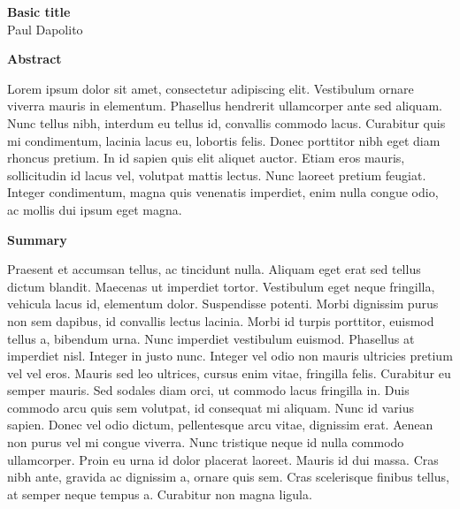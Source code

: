 \documentclass[letterpaper, boxed]{hmcpset}
\begin{document}
    \begin{center}
        \Large{\textbf{Basic title}} \\ 
        \large{Paul Dapolito} \\
    \end{center}

    \large \begin{flushleft}
    \textbf{Abstract}
    \end{flushleft}
    \normalsize
        Lorem ipsum dolor sit amet, consectetur adipiscing elit. Vestibulum ornare viverra mauris in elementum. Phasellus hendrerit ullamcorper ante sed aliquam. Nunc tellus nibh, interdum eu tellus id, convallis commodo lacus. Curabitur quis mi condimentum, lacinia lacus eu, lobortis felis. Donec porttitor nibh eget diam rhoncus pretium. In id sapien quis elit aliquet auctor. Etiam eros mauris, sollicitudin id lacus vel, volutpat mattis lectus. Nunc laoreet pretium feugiat. Integer condimentum, magna quis venenatis imperdiet, enim nulla congue odio, ac mollis dui ipsum eget magna.

    \large \begin{flushleft}
    \textbf{Summary}
    \end{flushleft}
    \normalsize
        Praesent et accumsan tellus, ac tincidunt nulla. Aliquam eget erat sed tellus dictum blandit. Maecenas ut imperdiet tortor. Vestibulum eget neque fringilla, vehicula lacus id, elementum dolor. Suspendisse potenti. Morbi dignissim purus non sem dapibus, id convallis lectus lacinia. Morbi id turpis porttitor, euismod tellus a, bibendum urna. Nunc imperdiet vestibulum euismod. Phasellus at imperdiet nisl. Integer in justo nunc. Integer vel odio non mauris ultricies pretium vel vel eros. Mauris sed leo ultrices, cursus enim vitae, fringilla felis. Curabitur eu semper mauris. Sed sodales diam orci, ut commodo lacus fringilla in. Duis commodo arcu quis sem volutpat, id consequat mi aliquam.
        Nunc id varius sapien. Donec vel odio dictum, pellentesque arcu vitae, dignissim erat. Aenean non purus vel mi congue viverra. Nunc tristique neque id nulla commodo ullamcorper. Proin eu urna id dolor placerat laoreet. Mauris id dui massa. Cras nibh ante, gravida ac dignissim a, ornare quis sem. Cras scelerisque finibus tellus, at semper neque tempus a. Curabitur non magna ligula.
\end{document}
